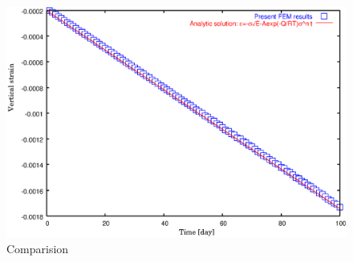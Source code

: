\begin{figure}[H]
  \centering
  \includegraphics[scale=0.5]{M/crp/bgra0.eps}
  \caption{Comparision}
  \label{fig:cmp}
\end{figure}
